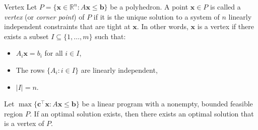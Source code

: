 \begin{definition}{Vertex}{}
Let \( P = \{ \mathbf{x} \in \mathbb{R}^n : A \mathbf{x} \leq \mathbf{b} \} \) be a polyhedron.  
A point \( \mathbf{x} \in P \) is called a \emph{vertex} (or \emph{corner point}) of \( P \) if it is the unique solution to a system of \( n \) linearly independent constraints that are tight at \( \mathbf{x} \).  
In other words, \( \mathbf{x} \) is a vertex if there exists a subset \( I \subseteq \{1, \dots, m\} \) such that:
\begin{itemize}
  \item \( A_i \mathbf{x} = b_i \) for all \( i \in I \),
  \item The rows \( \{ A_i : i \in I \} \) are linearly independent,
  \item \( |I| = n \).
\end{itemize}
\end{definition}

\begin{theorem}{}{}
Let \( \max \{ \mathbf{c}^\top \mathbf{x} : A \mathbf{x} \leq \mathbf{b} \} \) be a linear program with a nonempty, bounded feasible region \( P \).  
If an optimal solution exists, then there exists an optimal solution that is a vertex of \( P \).
\end{theorem}

